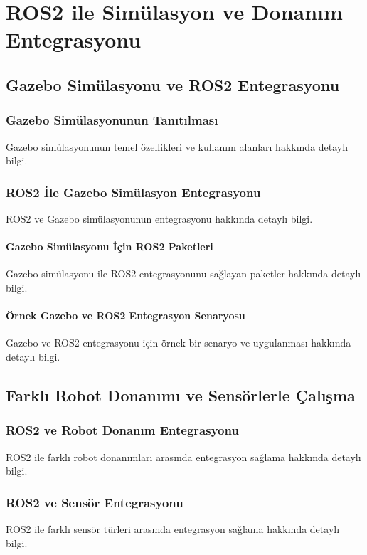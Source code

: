 \chapter{ROS2 ile Simülasyon ve Donanım Entegrasyonu}

\section{Gazebo Simülasyonu ve ROS2 Entegrasyonu}
\subsection{Gazebo Simülasyonunun Tanıtılması}
Gazebo simülasyonunun temel özellikleri ve kullanım alanları hakkında detaylı bilgi.

\subsection{ROS2 İle Gazebo Simülasyon Entegrasyonu}
ROS2 ve Gazebo simülasyonunun entegrasyonu hakkında detaylı bilgi.

\subsubsection{Gazebo Simülasyonu İçin ROS2 Paketleri}
Gazebo simülasyonu ile ROS2 entegrasyonunu sağlayan paketler hakkında detaylı bilgi.

\subsubsection{Örnek Gazebo ve ROS2 Entegrasyon Senaryosu}
Gazebo ve ROS2 entegrasyonu için örnek bir senaryo ve uygulanması hakkında detaylı bilgi.

\section{Farklı Robot Donanımı ve Sensörlerle Çalışma}
\subsection{ROS2 ve Robot Donanım Entegrasyonu}
ROS2 ile farklı robot donanımları arasında entegrasyon sağlama hakkında detaylı bilgi.

\subsection{ROS2 ve Sensör Entegrasyonu}
ROS2 ile farklı sensör türleri arasında entegrasyon sağlama hakkında detaylı bilgi.

